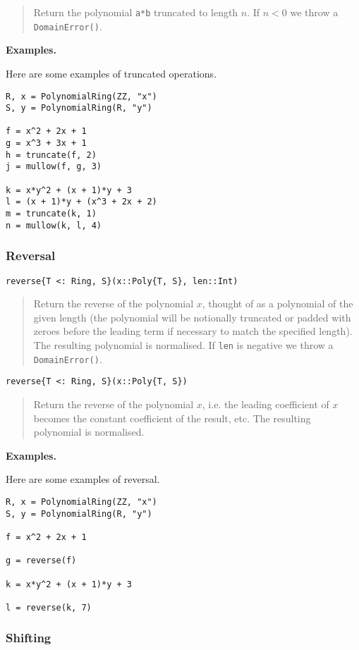 \documentclass[a4paper,10pt]{article}
\newcommand{\code}{\lstinline}
\newcommand{\desc}[1]{\vspace{-3mm}\begin{quote}#1\end{quote}}
\begin{document}
{{\desc{Return the polynomial \code{a*b} truncated to length $n$. If $n < 0$ we
throw a \code{DomainError()}.}

\textbf{Examples.}

Here are some examples of truncated operations.

\begin{lstlisting}
R, x = PolynomialRing(ZZ, "x")
S, y = PolynomialRing(R, "y")

f = x^2 + 2x + 1
g = x^3 + 3x + 1
h = truncate(f, 2)
j = mullow(f, g, 3)

k = x*y^2 + (x + 1)*y + 3
l = (x + 1)*y + (x^3 + 2x + 2)
m = truncate(k, 1)
n = mullow(k, l, 4)
\end{lstlisting}

\subsubsection{Reversal}

\begin{lstlisting}
reverse{T <: Ring, S}(x::Poly{T, S}, len::Int)
\end{lstlisting}

\desc{Return the reverse of the polynomial $x$, thought of as a polynomial of
the given length (the polynomial will be notionally truncated or padded with
zeroes before the leading term if necessary to match the specified length). 
The resulting polynomial is normalised. If \code{len} is negative we throw a
\code{DomainError()}.}

\begin{lstlisting}
reverse{T <: Ring, S}(x::Poly{T, S})
\end{lstlisting}

\desc{Return the reverse of the polynomial $x$, i.e. the leading coefficient
of $x$ becomes the constant coefficient of the result, etc. The resulting
polynomial is normalised.}

\textbf{Examples.}

Here are some examples of reversal.

\begin{lstlisting}
R, x = PolynomialRing(ZZ, "x")
S, y = PolynomialRing(R, "y")

f = x^2 + 2x + 1

g = reverse(f)

k = x*y^2 + (x + 1)*y + 3

l = reverse(k, 7)
\end{lstlisting}

\subsubsection{Shifting}

}}
\end{document}
